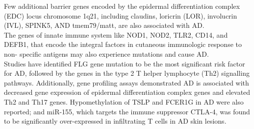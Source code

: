 \documentclass[journal, a4paper]{IEEEtran}
\begin{document}
Few additional barrier genes encoded by the epidermal differentiation complex (EDC) locus chromosome 1q21, including claudins, loricrin (LOR), involucrin (IVL), SPINK5, AND tmem79/matt, are also associated with AD.\\

The genes of innate immune system like NOD1, NOD2, TLR2, CD14, and DEFB1, that encode the integral factors in cutaneous immunologic response to non- specific antigens may also experience mutations and cause AD\cite{guttman2017atopic}.\\

Studies have identified FLG gene mutation to be the most significant risk factor for AD, followed by the genes in the type 2 T helper lymphocyte (Th2) signalling pathways. 
Additionally, gene profiling assays demonstrated AD is associated with decreased gene expression of epidermal differentiation complex genes and elevated Th2 and Th17 genes. Hypomethylation of TSLP and FCER1G in AD were also reported; and miR-155, which targets the immune suppressor CTLA-4, was found to be significantly over-expressed in infiltrating T cells in AD skin lesions\cite{bin2016genetic}.\\




\end{document}

